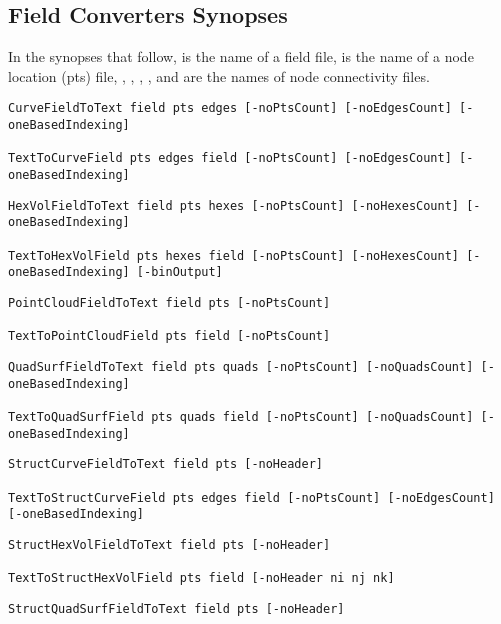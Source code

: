 {\subsection{Field Converters Synopses}

In the synopses that follow,  is the name of a \sr{}
field file,  is the name of a node location (pts) file,
, , , , and
 are the names of node connectivity files.

\begin{verbatim}
CurveFieldToText field pts edges [-noPtsCount] [-noEdgesCount] [-oneBasedIndexing]

TextToCurveField pts edges field [-noPtsCount] [-noEdgesCount] [-oneBasedIndexing]
\end{verbatim}

\begin{verbatim}
HexVolFieldToText field pts hexes [-noPtsCount] [-noHexesCount] [-oneBasedIndexing]

TextToHexVolField pts hexes field [-noPtsCount] [-noHexesCount] [-oneBasedIndexing] [-binOutput]
\end{verbatim}

\begin{verbatim}
PointCloudFieldToText field pts [-noPtsCount]

TextToPointCloudField pts field [-noPtsCount]
\end{verbatim}

\begin{verbatim}
QuadSurfFieldToText field pts quads [-noPtsCount] [-noQuadsCount] [-oneBasedIndexing]

TextToQuadSurfField pts quads field [-noPtsCount] [-noQuadsCount] [-oneBasedIndexing]
\end{verbatim}

\begin{verbatim}
StructCurveFieldToText field pts [-noHeader]

TextToStructCurveField pts edges field [-noPtsCount] [-noEdgesCount] [-oneBasedIndexing]
\end{verbatim}

\begin{verbatim}
StructHexVolFieldToText field pts [-noHeader]

TextToStructHexVolField pts field [-noHeader ni nj nk]
\end{verbatim}

\begin{verbatim}
StructQuadSurfFieldToText field pts [-noHeader]


\end{verbatim}}

